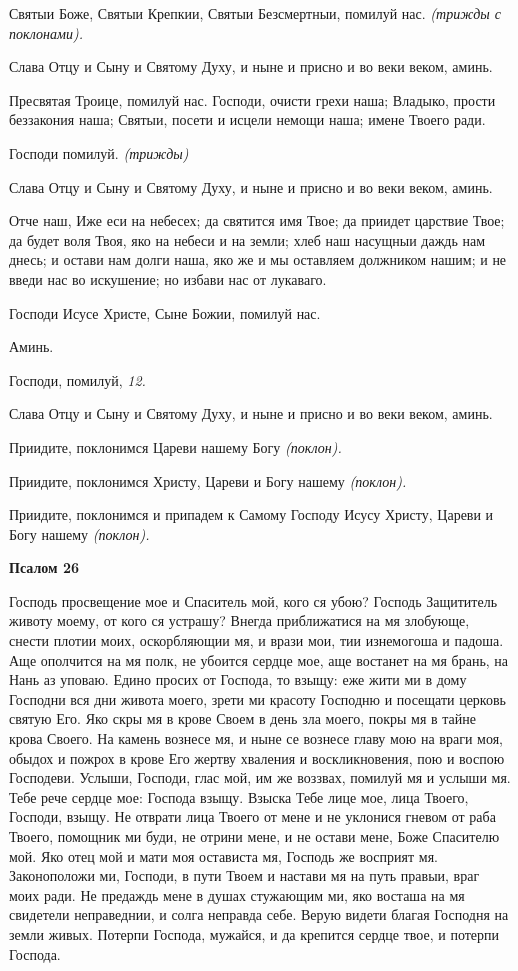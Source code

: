    Святыи Боже, Святыи Крепкии, Святыи Безсмертныи, помилуй нас.
\itshape (трижды с поклонами)\normalfont{}.


   Слава Отцу и Сыну и Святому Духу, и ныне и присно и во веки веком,
аминь.


   Пресвятая Троице, помилуй нас. Господи, очисти грехи наша; Владыко,
прости беззакония наша; Святыи, посети и исцели немощи наша; имене
Твоего ради.


   Господи помилуй. \itshape (трижды)\normalfont{}


   Слава Отцу и Сыну и Святому Духу, и ныне и присно и во веки веком,
аминь.


   Отче наш, Иже еси на небесех; да святится имя Твое; да приидет
царствие Твое; да будет воля Твоя, яко на небеси и на земли; хлеб наш
насущныи даждь нам днесь; и остави нам долги наша, яко же и мы
оставляем должником нашим; и не введи нас во искушение; но избави нас от
лукаваго.


   Господи Исусе Христе, Сыне Божии, помилуй нас.


   Аминь.


   Господи, помилуй, \itshape 12\normalfont{}.


   Слава Отцу и Сыну и Святому Духу, и ныне и присно и во веки веком,
аминь.



   Приидите, поклонимся Цареви нашему Богу \itshape (поклон)\normalfont{}.


   Приидите, поклонимся Христу, Цареви и Богу нашему \itshape (поклон)\normalfont{}.


   Приидите, поклонимся и припадем к Самому Господу Исусу Христу,
Цареви и Богу нашему \itshape (поклон)\normalfont{}.



 

\bfseries Псалом 26\normalfont{}


   Господь просвещение мое и Спаситель мой, кого ся убою? Господь
Защититель животу моему, от кого ся устрашу? Внегда приближатися на мя
злобующе, снести плотии моих, оскорбляющии мя, и врази мои, тии
изнемогоша и падоша. Аще ополчится на мя полк, не убоится сердце мое,
аще востанет на мя брань, на Нань аз уповаю. Едино просих от Господа, то
взыщу: еже жити ми в дому Господни вся дни живота моего, зрети ми
красоту Господню и посещати церковь святую Его. Яко скры мя в крове
Своем в день зла моего, покры мя в тайне крова Своего. На камень вознесе
мя, и ныне се вознесе главу мою на враги моя, обыдох и пожрох в крове
Его жертву хваления и воскликновения, пою и воспою Господеви.
Услыши, Господи, глас мой, им же воззвах, помилуй мя и услыши мя.
Тебе рече сердце мое: Господа взыщу. Взыска Тебе лице мое, лица
Твоего, Господи, взыщу. Не отврати лица Твоего от мене и не уклонися
гневом от раба Твоего, помощник ми буди, не отрини мене, и не остави
мене, Боже Спасителю мой. Яко отец мой и мати моя остависта мя,
Господь же восприят мя. Законоположи ми, Господи, в пути Твоем и
настави мя на путь правыи, враг моих ради. Не предаждь мене в
душах стужающим ми, яко восташа на мя свидетели неправеднии, и
солга неправда себе. Верую видети благая Господня на земли живых.
Потерпи Господа, мужайся, и да крепится сердце твое, и потерпи
Господа.



